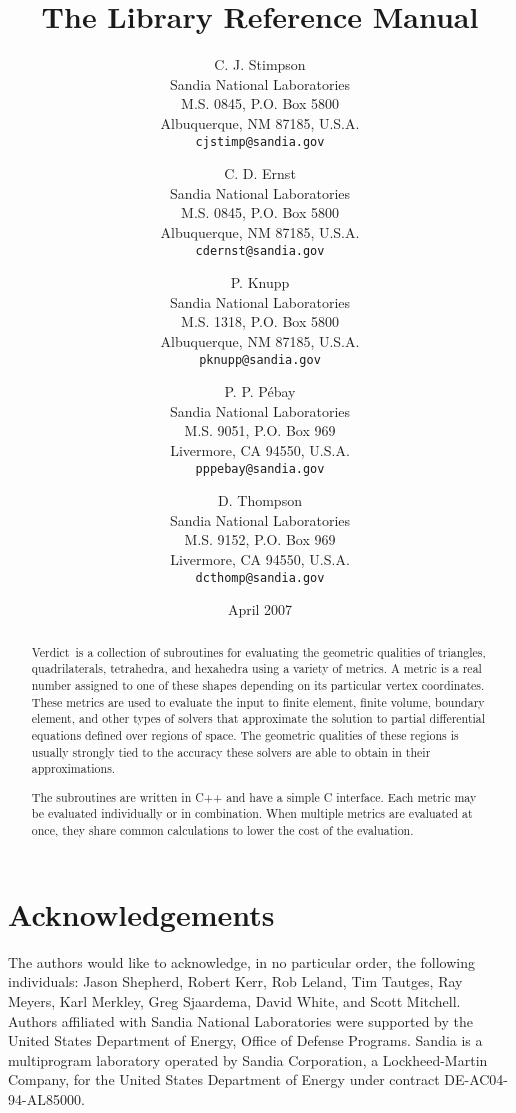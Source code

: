 \documentclass[11pt]{report}
\title{The \verd{} Library Reference Manual}
\author{C. J. Stimpson\\
        Sandia National Laboratories\\
        M.S. 0845, P.O. Box 5800\\
        Albuquerque, NM 87185, U.S.A.\\
        \texttt{cjstimp@sandia.gov}
        \and
        C. D. Ernst\\
        Sandia National Laboratories\\
        M.S. 0845, P.O. Box 5800\\
        Albuquerque, NM 87185, U.S.A.\\
        \texttt{cdernst@sandia.gov}
        \and
        P. Knupp\\
        Sandia National Laboratories\\
        M.S. 1318, P.O. Box 5800\\
        Albuquerque, NM 87185, U.S.A.\\
        \texttt{pknupp@sandia.gov}
        \and
        P. P. P\'ebay\\
        Sandia National Laboratories\\
        M.S. 9051, P.O. Box 969\\
        Livermore, CA 94550, U.S.A.\\
        \texttt{pppebay@sandia.gov}
        \and
        D. Thompson\\
        Sandia National Laboratories\\
        M.S. 9152, P.O. Box 969\\
        Livermore, CA 94550, U.S.A.\\
        \texttt{dcthomp@sandia.gov}
}
\date{April 2007}
\newcommand{\verd}{\textsf{Verdict}}
\begin{document}
\maketitle
\begin{abstract}
\verd\ is a collection of subroutines for evaluating the geometric qualities
of triangles, quadrilaterals, tetrahedra, and hexahedra using a variety of
metrics.
A metric is a real number assigned to one of these shapes depending on its
particular vertex coordinates.
These metrics are used to evaluate the input to finite element, finite volume,
boundary element, and other types of solvers that approximate the solution to
partial differential equations defined over regions of space.
The geometric qualities of these regions is usually strongly tied to the
accuracy these solvers are able to obtain in their approximations.

The subroutines are written in C++ and have a simple C interface.
Each metric may be evaluated individually or in combination.
When multiple metrics are evaluated at once, they share common
calculations to lower the cost of the evaluation.
\end{abstract}
\clearpage
\section*{Acknowledgements}
The authors would like to acknowledge, in no particular order, the
following individuals:
Jason Shepherd, Robert Kerr, Rob Leland, Tim Tautges, Ray Meyers, Karl
Merkley, Greg Sjaardema, David White, and Scott Mitchell.\\

Authors affiliated with Sandia National Laboratories were supported by
the United States Department of Energy, Office of Defense
Programs. Sandia is a multiprogram laboratory operated by Sandia
Corporation, a Lockheed-Martin Company, for the United States
Department of Energy under contract DE-AC04-94-AL85000.
\clearpage
\tableofcontents
\listoffigures
\cleardoublepage

\cleardoublepage

\cleardoublepage

\cleardoublepage

\cleardoublepage

\cleardoublepage

\cleardoublepage

\cleardoublepage

\cleardoublepage


\end{document}
